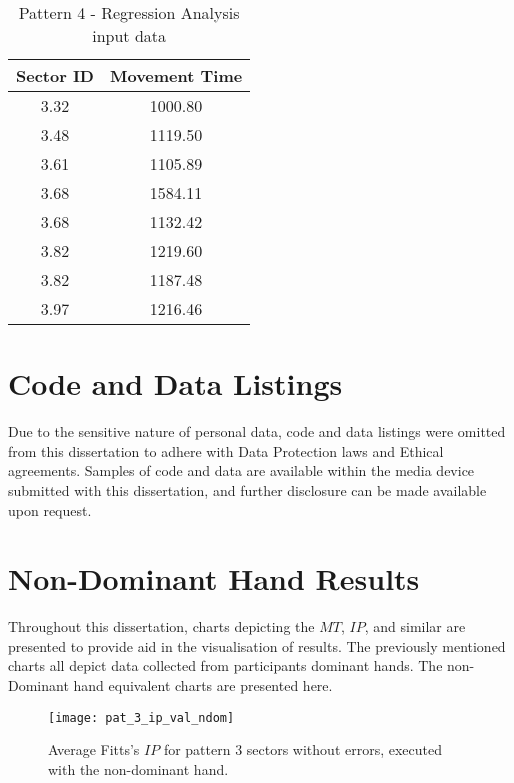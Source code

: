 \begin{appendices}
		\begin{table}[h]
			\centering
			\caption{Pattern 4 - Regression Analysis input data}
			\label{tab_pat_4_reg}
			\begin{tabular}{|c|c|}
				\hline
				\textbf{Sector ID} & \textbf{Movement Time} \\ \hline
				3.32               & 1000.80                \\ \hline
				3.48               & 1119.50                \\ \hline
				3.61               & 1105.89                \\ \hline
				3.68               & 1584.11                \\ \hline
				3.68               & 1132.42                \\ \hline
				3.82               & 1219.60                \\ \hline
				3.82               & 1187.48                \\ \hline
				3.97               & 1216.46                \\ \hline
			\end{tabular}
		\end{table}
		
	\section{Code and Data Listings}
		Due to the sensitive nature of personal data, code and data listings were omitted from this dissertation to adhere with Data Protection laws and Ethical agreements. Samples of code and data are available within the media device submitted with this dissertation, and further disclosure can be made available upon request.
		
	\section{Non-Dominant Hand Results}
		Throughout this dissertation, charts depicting the \(MT\), \(IP\), and similar are presented to provide aid in the visualisation of results. The previously mentioned charts all depict data collected from participants dominant hands. The non-Dominant hand equivalent charts are presented here.
		
		\begin{figure}[!htb]
			\centering
			\texttt{[image: pat\_3\_ip\_val\_ndom]}
			\caption{Average Fitts's \(IP\) for pattern 3 sectors without errors, executed with the non-dominant hand.}
			\label{fi_pat_3_ip_ndom}
		\end{figure}		
		

\end{appendices}
